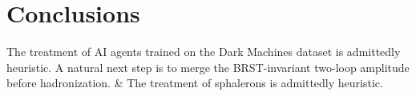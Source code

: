 \section{Conclusions}\label{sec:conclusions}

The treatment of AI agents trained on the Dark Machines dataset is
admittedly heuristic. A natural next step is to merge the BRST-invariant
two-loop amplitude before hadronization. & The treatment of sphalerons is
admittedly heuristic.

